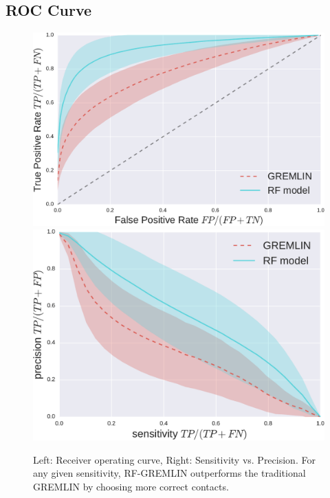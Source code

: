 \documentclass[landscape]{sciposter}
\newlength{\customfigheight}
\begin{document}
\begin{multicols}{3}
\section*{ROC Curve}
\begin{figure}
    \center 
    \includegraphics[height=\customfigheight]{figures/GREMLIN_RF_ROC-crop.pdf}%
    \hfill%
    \includegraphics[height=\customfigheight]{figures/GREMLIN_RF_Acc_Pre-crop.pdf}%
\caption{%
Left: Receiver operating curve, Right: Sensitivity vs. Precision.
For any given sensitivity, RF-GREMLIN outperforms the traditional GREMLIN by choosing more correct contacts.
}

\end{figure}

\end{multicols}
\end{document}
